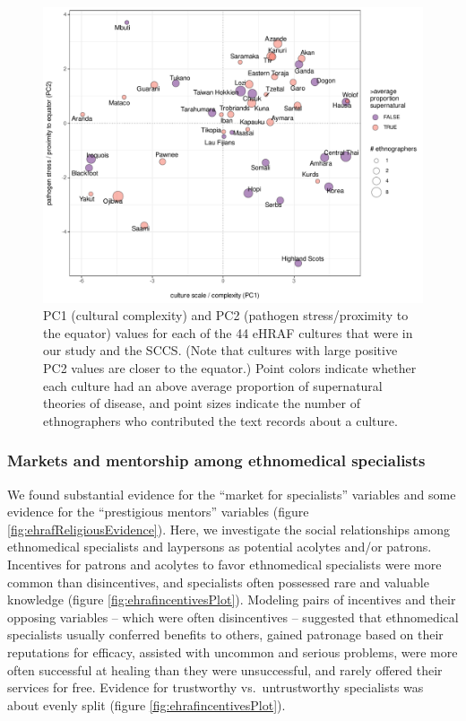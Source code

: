 \documentclass[
  11pt,
]{article}
\begin{document}
\begin{landscape}
\begin{figure}[p]

{\centering \includegraphics{magic-healers-article2_files/figure-latex/sccsBiplot-1} 

}

\caption{PC1 (cultural complexity) and PC2 (pathogen stress/proximity to the equator) values for each of the 44 eHRAF cultures that were in our study and the SCCS. (Note that cultures with large positive PC2 values are closer to the equator.) Point colors indicate whether each culture had an above average proportion of supernatural theories of disease, and point sizes indicate the number of ethnographers who contributed the text records about a culture.}\label{fig:sccsBiplot}
\end{figure}


\end{landscape}

\hypertarget{markets-and-mentorship-among-ethnomedical-specialists}{%
\subsubsection{Markets and mentorship among ethnomedical specialists}\label{markets-and-mentorship-among-ethnomedical-specialists}}

We found substantial evidence for the ``market for specialists'' variables and some evidence for the ``prestigious mentors'' variables (figure \ref{fig:ehrafReligiousEvidence}). Here, we investigate the social relationships among ethnomedical specialists and laypersons as potential acolytes and/or patrons. Incentives for patrons and acolytes to favor ethnomedical specialists were more common than disincentives, and specialists often possessed rare and valuable knowledge (figure \ref{fig:ehrafincentivesPlot}). Modeling pairs of incentives and their opposing variables -- which were often disincentives -- suggested that ethnomedical specialists usually conferred benefits to others, gained patronage based on their reputations for efficacy, assisted with uncommon and serious problems, were more often successful at healing than they were unsuccessful, and rarely offered their services for free. Evidence for trustworthy vs.~untrustworthy specialists was about evenly split (figure \ref{fig:ehrafincentivesPlot}).
\end{document}
